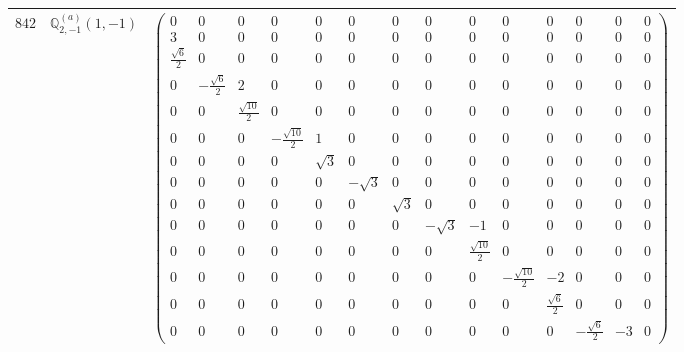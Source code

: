 \documentclass[fleqn,8pt,landscape]{jsarticle}
\begin{document}
\begin{center}
\begin{longtable}{ccc}
$ 842 $ & $ \mathbb{Q}_{2,-1}^{(a)}(1,-1) $ & $ \begin{pmatrix} 0 & 0 & 0 & 0 & 0 & 0 & 0 & 0 & 0 & 0 & 0 & 0 & 0 & 0 \\ 3 & 0 & 0 & 0 & 0 & 0 & 0 & 0 & 0 & 0 & 0 & 0 & 0 & 0 \\ \frac{\sqrt{6}}{2} & 0 & 0 & 0 & 0 & 0 & 0 & 0 & 0 & 0 & 0 & 0 & 0 & 0 \\ 0 & - \frac{\sqrt{6}}{2} & 2 & 0 & 0 & 0 & 0 & 0 & 0 & 0 & 0 & 0 & 0 & 0 \\ 0 & 0 & \frac{\sqrt{10}}{2} & 0 & 0 & 0 & 0 & 0 & 0 & 0 & 0 & 0 & 0 & 0 \\ 0 & 0 & 0 & - \frac{\sqrt{10}}{2} & 1 & 0 & 0 & 0 & 0 & 0 & 0 & 0 & 0 & 0 \\ 0 & 0 & 0 & 0 & \sqrt{3} & 0 & 0 & 0 & 0 & 0 & 0 & 0 & 0 & 0 \\ 0 & 0 & 0 & 0 & 0 & - \sqrt{3} & 0 & 0 & 0 & 0 & 0 & 0 & 0 & 0 \\ 0 & 0 & 0 & 0 & 0 & 0 & \sqrt{3} & 0 & 0 & 0 & 0 & 0 & 0 & 0 \\ 0 & 0 & 0 & 0 & 0 & 0 & 0 & - \sqrt{3} & -1 & 0 & 0 & 0 & 0 & 0 \\ 0 & 0 & 0 & 0 & 0 & 0 & 0 & 0 & \frac{\sqrt{10}}{2} & 0 & 0 & 0 & 0 & 0 \\ 0 & 0 & 0 & 0 & 0 & 0 & 0 & 0 & 0 & - \frac{\sqrt{10}}{2} & -2 & 0 & 0 & 0 \\ 0 & 0 & 0 & 0 & 0 & 0 & 0 & 0 & 0 & 0 & \frac{\sqrt{6}}{2} & 0 & 0 & 0 \\ 0 & 0 & 0 & 0 & 0 & 0 & 0 & 0 & 0 & 0 & 0 & - \frac{\sqrt{6}}{2} & -3 & 0 \end{pmatrix} $ \\ \hline

\end{longtable}
\end{center}
\end{document}
